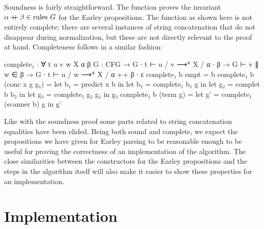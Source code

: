 
		Soundness is fairly straightforward. The  function proves
		the invariant $\alpha \mathbin{{+}\mspace{-8mu}{+}} \beta \in \textrm{rules } G$ for the
		Earley propositions. The function as shown here is not entirely
		complete: there are several instances of string concatenation that do
		not disappear during normalization, but these are not directly relevant
		to the proof at hand. Completeness follows in a similar fashion:

		\begin{code}
			complete₁ : ∀ {t u v w X α β} {G : CFG} →
			  G ∙ t ⊢ u / v ⟶* X / α ∙ β →
			    G ⊢ v ∥ w ∈ β →
			  G ∙ t ⊢ u / w ⟶* X / α ++ β ∙ ε
			complete₁ b empt = b
			complete₁ b (conc x g g₁) =
			  let b₁ = predict x b in
			  let b₂ = complete₁ b₁ g in
			  let g₂ = complet b b₂ in
			  let g₃ = complete₁ g₂ g₁ in
			  g₃
			complete₁ b (term g) =
			  let g' = complete₁ (scanner b) g in
			  g'
		\end{code}

		Like with the soundness proof some parts related to string
		concatenation equalities have been elided. Being both sound and
		complete, we expect the propositions we have given for Earley parsing
		to be reasonable enough to be useful for proving the correctness of an
		implementation of the algorithm. The close similarities between the
		constructors for the Earley propositions and the steps in the algorithm
		itself will also make it easier to show these properties for an
		implementation.

	\section{Implementation}

